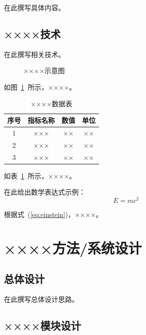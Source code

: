 \documentclass[12pt, a4paper, openany]{ctexbook}
\begin{document}
在此撰写具体内容。

\section{××××技术}

在此撰写相关技术。

\begin{figure}[htbp]
  \centering
  \caption{××××示意图}
  \label{fig:example}
\end{figure}

如图~\ref{fig:example}~所示，××××。

\begin{table}[htbp]
  \centering
  \caption{××××数据表}
  \label{tab:example}
  \songti  %
  \begin{tabular}{cccc}
    \toprule
    序号 & 指标名称 & 数值 & 单位 \\
    \midrule
    1 & ××× & ×× & ×× \\
    2 & ××× & ×× & ×× \\
    3 & ××× & ×× & ×× \\
    \bottomrule
  \end{tabular}
\end{table}

如表~\ref{tab:example}~所示，××××。

在此给出数学表达式示例：
\begin{equation}
  E = mc^2
  \label{eq:einstein}
\end{equation}

根据式~(\ref{eq:einstein})，××××。

\chapter{××××方法/系统设计}

\section{总体设计}

在此撰写总体设计思路。

\section{××××模块设计}
\end{document}
